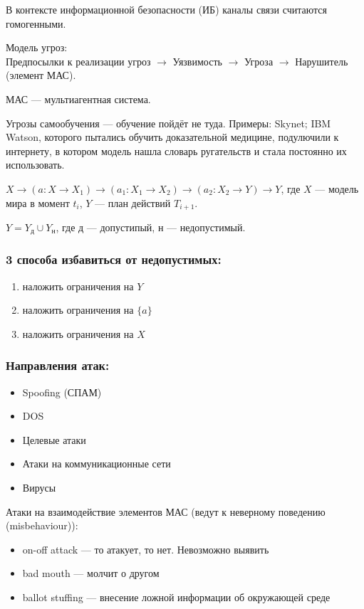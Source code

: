 \documentclass{article}
\begin{document}
В контексте информационной безопасности (ИБ) каналы связи считаются гомогенными.

Модель угроз: \\
Предпосылки к реализации угроз $\rightarrow$ Уязвимость $\rightarrow$ Угроза $\rightarrow$ Нарушитель (элемент МАС).

МАС — мультиагентная система.

Угрозы самообучения — обучение пойдёт не туда. Примеры: Skynet; IBM Watson, которого пытались обучить доказательной медицине, подулючили к интернету, в котором модель нашла словарь ругательств и стала постоянно их использовать.

$X \rightarrow (a: X \rightarrow X_1) \rightarrow (a_1: X_1 \rightarrow X_2) \rightarrow (a_2: X_2 \rightarrow Y) \rightarrow Y$, где $X$ — модель мира в момент $t_i$, $Y$ — план действий $T_{i + 1}$.

$Y = Y_{\text{д}} \cup Y_\text{н}$, где д — допустипый, н — недопустимый.

\subsubsection*{3 способа избавиться от недопустимых:}
\begin{enumerate}
    \item наложить ограничения на $Y$
    \item наложить ограничения на $\{a\}$
    \item наложить ограничения на $X$
\end{enumerate}

\subsubsection*{Направления атак:}
\begin{itemize}
    \item Spoofing (СПАМ)
    \item DOS
    \item Целевые атаки
    \item Атаки на коммуникационные сети
    \item Вирусы
\end{itemize}

Атаки на взаимодействие элементов МАС (ведут к неверному поведению (misbehaviour)):
\begin{itemize}
    \item on-off attack — то атакует, то нет. Невозможно выявить
    \item bad mouth — молчит о другом
    \item ballot stuffing — внесение ложной информации об окружающей среде
\end{itemize}
\end{document}
